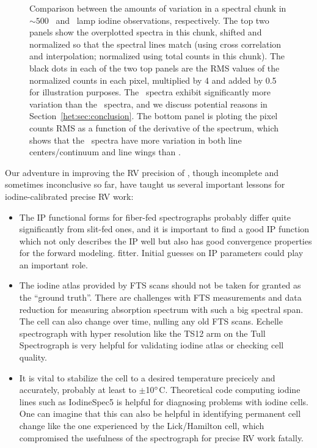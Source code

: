\begin{figure}
\caption{Comparison between the amounts of variation in a spectral
chunk in $\sim 500$ \het\ and \keck\ lamp iodine observations,
respectively. The top two panels show the overplotted spectra in this
chunk, shifted and normalized so that the spectral lines match (using
cross correlation and interpolation; normalized using total counts in
this chunk). The black dots in each of the two top panels are the RMS
values of the normalized counts in each pixel, multiplied by 4 and
added by 0.5 for illustration purposes. The \het\ spectra exhibit
significantly more variation than the \keck\ spectra, and we discuss
potential reasons in Section~\ref{het:sec:conclusion}. The bottom
panel is ploting the pixel counts RMS as a function of the derivative
of the spectrum, which shows that the \het\ spectra have more
variation in both line centers/continuum and line wings than \keck.
\label{het:fig:chunkvary}}
\end{figure}

Our adventure in improving the RV precision of \het, though incomplete
and sometimes inconclusive so far, have taught us several important
lessons for iodine-calibrated precise RV work:

\begin{itemize}
  \item The IP functional forms for fiber-fed spectrographs probably
differ quite significantly from slit-fed ones, and it is important to
find a good IP function which not only describes the IP well but also
has good convergence properties for the forward modeling.
fitter. Initial guesses on IP parameters could play an important role.
  \item The iodine atlas provided by FTS scans should not be taken for
granted as the ``ground truth''. There are challenges with FTS
measurements and data reduction for measuring absorption spectrum with
such a big spectral span. The cell can also change over time, nulling
any old FTS scans. Echelle spectrograph with hyper resolution like the
TS12 arm on the Tull Spectrograph is very helpful for validating
iodine atlas or checking cell quality.
  \item It is vital to stabilize the cell to a desired temperature
precicely and accurately, probably at least to
$\pm$10$^{\circ}$C. Theoretical code computing iodine lines such as
IodineSpec5 is helpful for diagnosing problems with iodine cells. One
can imagine that this can also be helpful in identifying permanent
cell change like the one experienced by the Lick/Hamilton cell, which
compromised the usefulness of the spectrograph for precise RV work
fatally.
\end{itemize}

